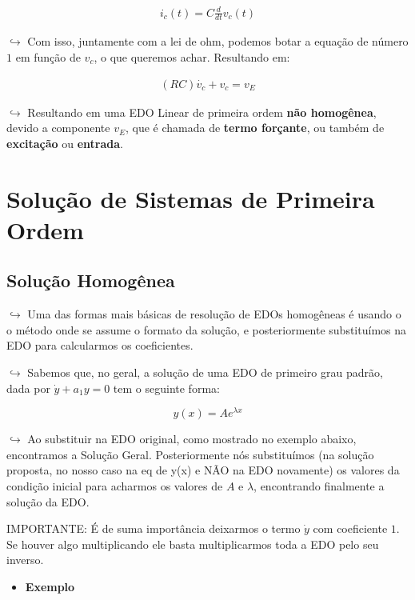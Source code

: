 \documentclass{article}
\begin{document}
\begin{itemize}
\[
\begin{align}i_c(t) = C \frac{d}{dt}v_c(t)\end{align}
\]

\(\hookrightarrow\) Com isso, juntamente com a lei de ohm, podemos botar
a equação de número \(1\) em função de \(v_c\), o que queremos achar.
Resultando em:

\[
\begin{align}(RC)\dot{v_c} + v_c = v_E\end{align}
\]

\(\hookrightarrow\) Resultando em uma EDO Linear de primeira ordem
\textbf{não homogênea}, devido a componente \(v_E\), que é chamada de
\textbf{termo forçante}, ou também de \textbf{excitação} ou
\textbf{entrada}.

\hypertarget{soluuxe7uxe3o-de-sistemas-de-primeira-ordem}{%
\section{Solução de Sistemas de Primeira
Ordem}\label{soluuxe7uxe3o-de-sistemas-de-primeira-ordem}}

\hypertarget{soluuxe7uxe3o-homoguxeanea}{%
\subsection{Solução Homogênea}\label{soluuxe7uxe3o-homoguxeanea}}

\(\hookrightarrow\) Uma das formas mais básicas de resolução de EDOs
homogêneas é usando o o método onde se assume o formato da solução, e
posteriormente substituímos na EDO para calcularmos os coeficientes.

\(\hookrightarrow\) Sabemos que, no geral, a solução de uma EDO de
primeiro grau padrão, dada por \(\dot y + a_1y = 0\) tem o seguinte
forma:

\[
y(x) = Ae^{\lambda x}
\]

\(\hookrightarrow\) Ao substituir na EDO original, como mostrado no
exemplo abaixo, encontramos a Solução Geral. Posteriormente nós
substituímos (na solução proposta, no nosso caso na eq de y(x) e NÃO na
EDO novamente) os valores da condição inicial para acharmos os valores
de \(A\) e \(\lambda\), encontrando finalmente a solução da EDO.

IMPORTANTE: É de suma importância deixarmos o termo \(\dot y\) com
coeficiente \(1\). Se houver algo multiplicando ele basta multiplicarmos
toda a EDO pelo seu inverso.

\begin{itemize}
\item
  \textbf{Exemplo}


\end{itemize}
\end{itemize}
\end{document}
